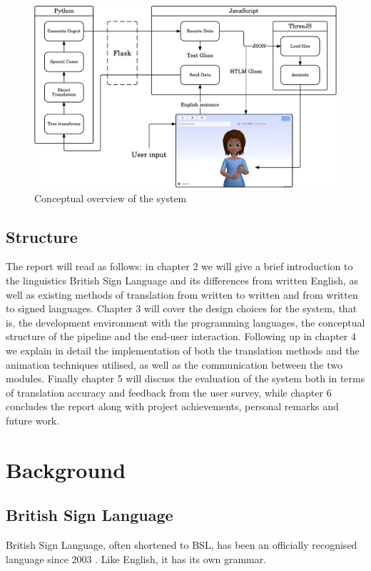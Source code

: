 \documentclass[12pt]{ociamthesis}  %
\begin{document}
\begin{figure}[h]
	\centering
    \includegraphics[scale=0.7]{system-overview}
    \caption{Conceptual overview of the system}
    \label{fig:sys-overview}
\end{figure}

\section{Structure}
The report will read as follows: in chapter 2 we will give a brief introduction to the linguistics British Sign Language and its differences from written English, as well as existing methods of translation from written to written and from written to signed languages. Chapter 3 will cover the design choices for the system, that is, the development environment with the programming languages, the conceptual structure of the pipeline and the end-user interaction. Following up in chapter 4 we explain in detail the implementation of both the translation methods and the animation techniques utilised, as well as the communication between the two modules. Finally chapter 5 will discuss the evaluation of the system both in terms of translation accuracy and feedback from the user survey, while chapter 6 concludes the report along with project achievements, personal remarks and future work.


\chapter{Background}
\section{British Sign Language}
British Sign Language, often shortened to BSL, has been an officially recognised language since 2003 . Like English, it has its own grammar.
 
\end{document}
